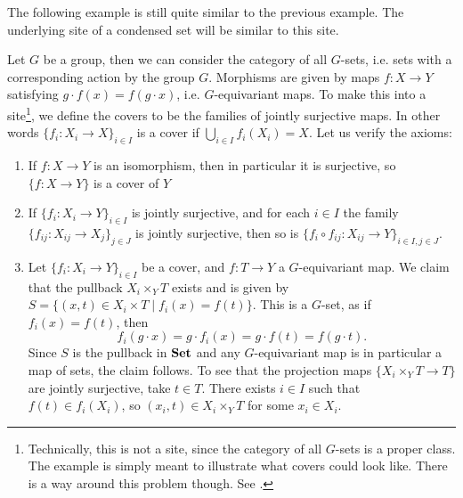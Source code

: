 \documentclass{article}
\begin{document}
The following example is still quite similar to the previous
example. The underlying site of a condensed set will be similar
to this site.
\begin{example}
    Let $G$ be a group, then we can consider the category
    of all $G$-sets, i.e. sets with a corresponding action
    by the group $G$. Morphisms are given by maps $f \colon X \to Y$
    satisfying $g\cdot f(x) = f(g\cdot x)$, i.e. $G$-equivariant
    maps. To make this into a site\footnote{
        Technically, this is not a site, since the category
        of all $G$-sets is a proper class. The example is
        simply meant to illustrate what covers could look like.
        There is a way around this problem though. See
        \cite[\href{https://stacks.math.columbia.edu/tag/00VK}{Example 00VK}]{stacks-project}.
    }, we define the covers to be the
    families of jointly surjective maps. In other words
    $\{f_i \colon X_i \to X\}_{i\in I}$ is a cover if
    $\bigcup_{i\in I}f_i(X_i) = X$. Let us verify the axioms:
    \begin{enumerate}
        \item If $f \colon X \to Y$ is an isomorphism, then
              in particular it is surjective, so $\{f \colon X \to Y\}$ is a cover
              of $Y$
        \item If $\{f_i \colon X_i \to Y\}_{i\in I}$ is jointly surjective, and
              for each $i\in I$ the family $\{f_{ij} \colon X_{ij} \to X_j\}_{j\in J}$ is jointly
              surjective, then so is $\{f_i \circ f_{ij}\colon X_{ij} \to Y\}_{i\in I, j\in J}$.
        \item Let $\{f_i \colon X_i \to Y\}_{i\in I}$ be a cover,
              and $f\colon T \to Y$ a $G$-equivariant map. We claim that the pullback
              $X_i \times_Y T$ exists and is given by
              $S = \{(x,t)\in X_i \times T \mid f_i(x) = f(t)\}$.
              This is a $G$-set, as if $f_i(x) = f(t)$, then
              \begin{equation*}
                  f_i(g\cdot x) = g\cdot f_i(x) = g\cdot f(t) = f(g \cdot t).
              \end{equation*}
              Since $S$ is the pullback in $\operatorname{\mathbf{Set}}$ and any $G$-equivariant map
              is in particular a map of sets, the claim follows.
              To see that the projection maps $\{X_i \times_Y T \to T\}$
              are jointly surjective, take $t\in T$. There exists $i\in I$
              such that $f(t) \in f_i(X_i)$, so $(x_i, t) \in X_i \times_Y T$
              for some $x_i \in X_i$.
    \end{enumerate}
\end{example}
\end{document}
